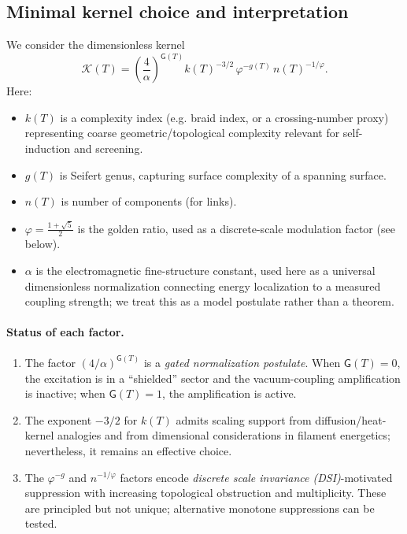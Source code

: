 \documentclass[11pt]{article}
\newcommand{\phig}{\varphi}
\newcommand{\alphafs}{\alpha}
\newcommand{\Gate}{\mathsf{G}}                 %
\theoremstyle{definition}
\theoremstyle{plain}
\theoremstyle{remark}
\begin{document}
        \subsection{Minimal kernel choice and interpretation}
            We consider the dimensionless kernel
            \begin{equation}
                \mathcal{K}(T)=\left(\frac{4}{\alphafs}\right)^{\Gate(T)} k(T)^{-3/2}\,\phig^{-g(T)}\,n(T)^{-1/\phig}.
                \label{eq:kernel}
            \end{equation}
            Here:
            \begin{itemize}
                \item $k(T)$ is a complexity index (e.g. braid index, or a crossing-number proxy) representing coarse geometric/topological complexity relevant for self-induction and screening.
                \item $g(T)$ is Seifert genus, capturing surface complexity of a spanning surface.
                \item $n(T)$ is number of components (for links).
                \item $\phig=\frac{1+\sqrt{5}}{2}$ is the golden ratio, used as a discrete-scale modulation factor (see below).
                \item $\alphafs$ is the electromagnetic fine-structure constant, used here as a universal dimensionless normalization connecting energy localization to a measured coupling strength; we treat this as a model postulate rather than a theorem.
            \end{itemize}

            \paragraph{Status of each factor.}
                \begin{enumerate}
                    \item The factor $(4/\alphafs)^{\Gate(T)}$ is a \emph{gated normalization postulate}. When $\Gate(T)=0$, the excitation is in a ``shielded'' sector and the vacuum-coupling amplification is inactive; when $\Gate(T)=1$, the amplification is active.
                    \item The exponent $-3/2$ for $k(T)$ admits scaling support from diffusion/heat-kernel analogies and from dimensional considerations in filament energetics; nevertheless, it remains an effective choice.
                    \item The $\phig^{-g}$ and $n^{-1/\phig}$ factors encode \emph{discrete scale invariance (DSI)}-motivated suppression with increasing topological obstruction and multiplicity. These are principled but not unique; alternative monotone suppressions can be tested.
                \end{enumerate}
\end{document}
